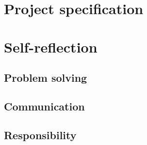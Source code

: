 \documentclass[12pt]{article}
\begin{document}
\section{Project specification}
\label{sec:section-1}
    \thispagestyle{fancy}

\section{Self-reflection}
\label{sec:section-2}
    \subsection{Problem solving}
    \subsection{Communication}
    \subsection{Responsibility}
\end{document}
